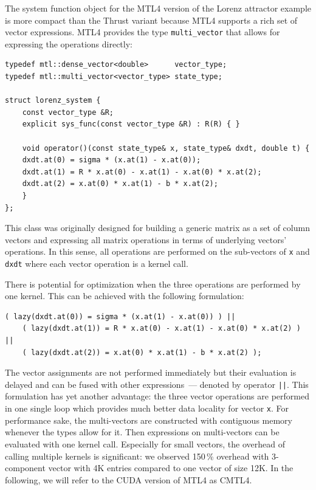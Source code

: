 \documentclass[final]{siamltex}
\newcommand{\code}[1]{\lstinline$#1$}
\begin{document}
The system function object for the MTL4 version of the Lorenz attractor example is
more compact than the Thrust variant because MTL4 supports a rich set of vector
expressions.  MTL4 provides the type \code{multi_vector} that allows for
expressing the operations directly:
\begin{lstlisting}
typedef mtl::dense_vector<double>      vector_type;
typedef mtl::multi_vector<vector_type> state_type;

struct lorenz_system {
    const vector_type &R;
    explicit sys_func(const vector_type &R) : R(R) { }

    void operator()(const state_type& x, state_type& dxdt, double t) {
	dxdt.at(0) = sigma * (x.at(1) - x.at(0));
	dxdt.at(1) = R * x.at(0) - x.at(1) - x.at(0) * x.at(2);
	dxdt.at(2) = x.at(0) * x.at(1) - b * x.at(2);
    }
};
\end{lstlisting}
This class was originally designed for building a generic matrix as a set of
column vectors and expressing all matrix operations in terms of underlying
vectors' operations.
In this sense, all operations are performed on the sub-vectors of \code{x} and
\code{dxdt} where each vector operation is a kernel call.

There is potential for optimization when the three operations are performed by one
kernel.
This can be achieved with the following formulation:
\begin{lstlisting}[firstnumber=9]
    ( lazy(dxdt.at(0)) = sigma * (x.at(1) - x.at(0)) ) ||
    ( lazy(dxdt.at(1)) = R * x.at(0) - x.at(1) - x.at(0) * x.at(2) ) ||
    ( lazy(dxdt.at(2)) = x.at(0) * x.at(1) - b * x.at(2) );
\end{lstlisting}
The vector assignments are not performed immediately but their evaluation is delayed
and can be fused with other expressions~--- denoted by operator \code{||}. 
This formulation has yet another advantage: the three vector operations
are performed in one single loop which provides much better data locality
for vector \code{x}.
For performance sake, the multi-vectors are constructed with contiguous memory
whenever the types allow for it.
Then expressions on multi-vectors can be evaluated with one kernel call.
Especially for small vectors, the overhead of calling multiple kernels
is significant: we observed 150\,\% overhead with 3-component vector with 4K
entries compared to one vector of size 12K.  In the following, we will refer to
the CUDA version of MTL4 as CMTL4.
\end{document}
